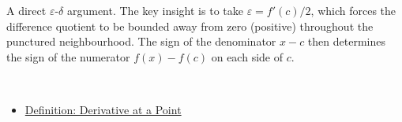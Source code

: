 \begin{remark*}
A direct $\varepsilon$-$\delta$ argument. The key insight is to take $\varepsilon = f'(c)/2$, which forces the difference quotient to be bounded away from zero (positive) throughout the punctured neighbourhood. The sign of the denominator $x - c$ then determines the sign of the numerator $f(x) - f(c)$ on each side of $c$.
\end{remark*}

\begin{remark*}[Dependencies]~\\
\begin{itemize}
  \item \hyperref[def:derivative-at-a-point]{Definition: Derivative at a Point}
\end{itemize}
\end{remark*}
